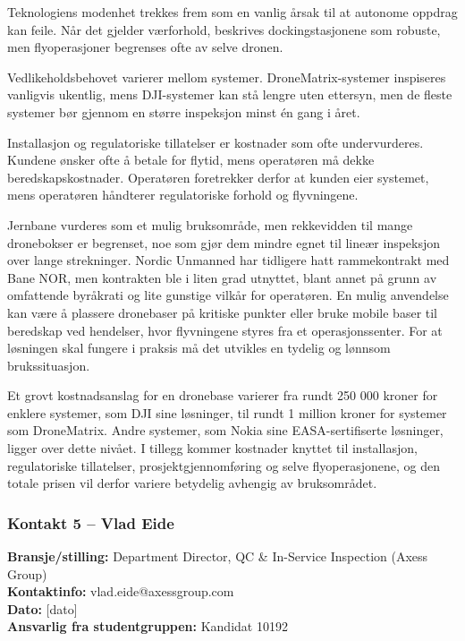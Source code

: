 Teknologiens modenhet trekkes frem som en vanlig årsak til at autonome oppdrag kan feile. Når det gjelder værforhold, beskrives dockingstasjonene som robuste, men flyoperasjoner begrenses ofte av selve dronen. 

Vedlikeholdsbehovet varierer mellom systemer. DroneMatrix-systemer inspiseres vanligvis ukentlig, mens DJI-systemer kan stå lengre uten ettersyn, men de fleste systemer bør gjennom en større inspeksjon minst én gang i året. 

Installasjon og regulatoriske tillatelser er kostnader som ofte undervurderes. Kundene ønsker ofte å betale for flytid, mens operatøren må dekke beredskapskostnader. Operatøren foretrekker derfor at kunden eier systemet, mens operatøren håndterer regulatoriske forhold og flyvningene. 

Jernbane vurderes som et mulig bruksområde, men rekkevidden til mange dronebokser er begrenset, noe som gjør dem mindre egnet til lineær inspeksjon over lange strekninger. Nordic Unmanned har tidligere hatt rammekontrakt med Bane NOR, men kontrakten ble i liten grad utnyttet, blant annet på grunn av omfattende byråkrati og lite gunstige vilkår for operatøren. En mulig anvendelse kan være å plassere dronebaser på kritiske punkter eller bruke mobile baser til beredskap ved hendelser, hvor flyvningene styres fra et operasjonssenter. For at løsningen skal fungere i praksis må det utvikles en tydelig og lønnsom brukssituasjon.

Et grovt kostnadsanslag for en dronebase varierer fra rundt 250 000 kroner for enklere systemer, som DJI sine løsninger, til rundt 1 million kroner for systemer som DroneMatrix. Andre systemer, som Nokia sine EASA-sertifiserte løsninger, ligger over dette nivået. I tillegg kommer kostnader knyttet til installasjon, regulatoriske tillatelser, prosjektgjennomføring og selve flyoperasjonene, og den totale prisen vil derfor variere betydelig avhengig av bruksområdet.

\subsubsection{Kontakt 5  – Vlad Eide}
\label{kontakt:eide}

\textbf{Bransje/stilling:} Department Director, QC \& In-Service Inspection (Axess Group) \\
\textbf{Kontaktinfo:} vlad.eide@axessgroup.com \\
\textbf{Dato:} [dato] \\
\textbf{Ansvarlig fra studentgruppen:} Kandidat 10192

